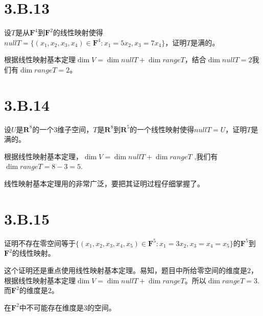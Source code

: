 \documentclass[10pt,a4paper,UTF8]{article}
\begin{document}
\section{3.B.13}
\label{sec:org9725702}


\begin{problem}
设\(T\)是从\(\mathbf{F}^{4}\)到\(\mathbf{F}^{2}\)的线性映射使得\(nullT = \{(x_{1},x_{2},x_{3},x_{4})\in \mathbf{F}^{4}:x_{1} = 5x_{2},x_{3} = 7x_{4}\}\)，证明\(T\)是满的。
\end{problem}

\begin{answer}
根据线性映射基本定理\(\dim V = \dim nullT + \dim rangeT\)，结合\(\dim nullT = 2\)我们有\(\dim rangeT = 2\)。
\end{answer}
\section{3.B.14}
\label{sec:orgd4fe291}


\begin{problem}
设\(U\)是\(\mathbf{R}^{8}\)的一个\(3\)维子空间，\(T\)是\(\mathbf{R}^{8}\)到\(\mathbf{R}^{5}\)的一个线性映射使得\(nullT = U\)，证明\(T\)是满的。
\end{problem}

\begin{answer}
根据线性映射基本定理，\(\dim V = \dim nullT + \dim rangeT\) ,我们有\(\dim rangeT = 8-3 = 5\).

线性映射基本定理用的非常广泛，要把其证明过程仔细掌握了。
\end{answer}

\section{3.B.15}
\label{sec:org67714ac}


\begin{problem}
证明不存在零空间等于\(\{(x_{1},x_{2},x_{3},x_{4},x_{5}) \in \mathbf{F}^{5}: x_{1} = 3x_{2},x_{3} = x_{4}=x_{5}\}\)的\(\mathbf{F}^{5}\)到\(\mathbf{F}^{2}\)的线性映射。
\end{problem}

\begin{answer}
这个证明还是重点使用线性映射基本定理。易知，题目中所给零空间的维度是\(2\)，根据线性映射基本定理\(\dim V = \dim nullT + \dim rangeT\)。所以\(\dim rangeT = 3\). 而\(\mathbf{F}^{2}\)的维度是\(2\)。

在\(\mathbf{F}^{2}\)中不可能存在维度是\(3\)的空间。
\end{answer}
\end{document}
